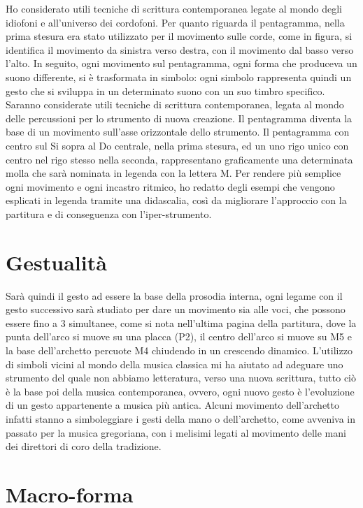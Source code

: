 Ho considerato utili tecniche di scrittura contemporanea legate al mondo degli idiofoni e all'universo dei cordofoni. Per quanto riguarda il pentagramma, nella prima stesura era stato utilizzato per il movimento sulle corde, come in figura, si identifica il movimento da sinistra verso destra, con il movimento dal basso verso l'alto. In seguito, ogni movimento sul pentagramma, ogni forma che produceva un suono differente, si è trasformata in simbolo: ogni simbolo rappresenta quindi un gesto che si sviluppa in un determinato suono con un suo timbro specifico.
Saranno considerate utili tecniche di scrittura contemporanea, legata al mondo delle percussioni per lo strumento di nuova creazione. Il pentagramma diventa la base di un movimento sull'asse orizzontale dello strumento. Il pentagramma con centro sul Si sopra al Do centrale, nella prima stesura, ed un uno rigo unico con centro nel rigo stesso nella seconda, rappresentano graficamente una determinata molla che sarà nominata in legenda con la lettera M. Per rendere più semplice ogni movimento e ogni incastro ritmico, ho redatto degli esempi che vengono esplicati in legenda tramite una didascalia, così da migliorare l'approccio con la partitura e di conseguenza con l'iper-strumento.

\section{Gestualità}

Sarà quindi il gesto ad essere la base della prosodia interna, ogni legame con il gesto successivo sarà studiato per dare un movimento sia alle voci, che possono essere fino a 3 simultanee, come si nota nell'ultima pagina della partitura, dove la punta dell'arco si muove su una placca (P2), il centro dell'arco si muove su M5 e la base dell'archetto percuote M4 chiudendo in un crescendo dinamico.
L'utilizzo di simboli vicini al mondo della musica classica mi ha aiutato ad adeguare uno strumento del quale non abbiamo letteratura, verso una nuova scrittura, tutto ciò è la base poi della musica contemporanea, ovvero, ogni nuovo gesto è l'evoluzione di un gesto appartenente a musica più antica. Alcuni movimento dell'archetto infatti stanno a simboleggiare i gesti della mano o dell'archetto, come avveniva in passato per la musica gregoriana, con i melisimi legati al movimento delle mani dei direttori di coro della tradizione.

\section{Macro-forma}

